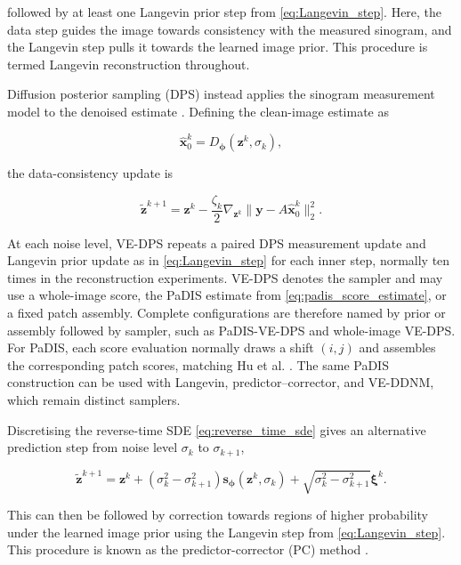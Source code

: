 followed by at least one Langevin prior step from \eqref{eq:Langevin_step}. Here, the data step guides the image towards consistency with the measured sinogram, and the Langevin step pulls it towards the learned image prior. This procedure is termed Langevin reconstruction throughout.

Diffusion posterior sampling (DPS) instead applies the sinogram measurement model to the denoised estimate \cite{chung_diffusion_2022}. Defining the clean-image estimate as

\begin{equation}
\hat{\mathbf{x}}_0^k
=
D_{\boldsymbol{\phi}}(\mathbf{z}^k,\sigma_k),
\label{eq:dps_clean_estimate}
\end{equation}

the data-consistency update is

\begin{equation}
\tilde{\mathbf{z}}^{k+1}
=
\mathbf{z}^k
-
\frac{\zeta_k}{2}
\nabla_{\mathbf{z}^k}
\|\mathbf{y}-A\hat{\mathbf{x}}_0^k\|_2^2.
\label{eq:dps_data_update}
\end{equation}

At each noise level, VE-DPS repeats a paired DPS measurement update and Langevin prior update as in \eqref{eq:Langevin_step} for each inner step, normally ten times in the reconstruction experiments. VE-DPS denotes the sampler and may use a whole-image score, the PaDIS estimate from \autoref{eq:padis_score_estimate}, or a fixed patch assembly. Complete configurations are therefore named by prior or assembly followed by sampler, such as PaDIS-VE-DPS and whole-image VE-DPS. For PaDIS, each score evaluation normally draws a shift $(i,j)$ and assembles the corresponding patch scores, matching Hu et al. \cite{hu_learning_2024}. The same PaDIS construction can be used with Langevin, predictor--corrector, and VE-DDNM, which remain distinct samplers.

Discretising the reverse-time SDE \eqref{eq:reverse_time_sde} gives an alternative prediction step from noise level $\sigma_k$ to $\sigma_{k+1}$,

\begin{equation}
\tilde{\mathbf{z}}^{k+1}
=
\mathbf{z}^k
+
(\sigma_k^2-\sigma_{k+1}^2)
\mathbf{s}_{\boldsymbol{\phi}}(\mathbf{z}^k,\sigma_k)
+
\sqrt{\sigma_k^2-\sigma_{k+1}^2}\boldsymbol{\xi}^k.
\label{eq:pc_predictor_step}
\end{equation}

This can then be followed by correction towards regions of higher probability under the learned image prior using the Langevin step from \eqref{eq:Langevin_step}. This procedure is known as the predictor-corrector (PC) method \cite{song_score-based_2020-1}.

